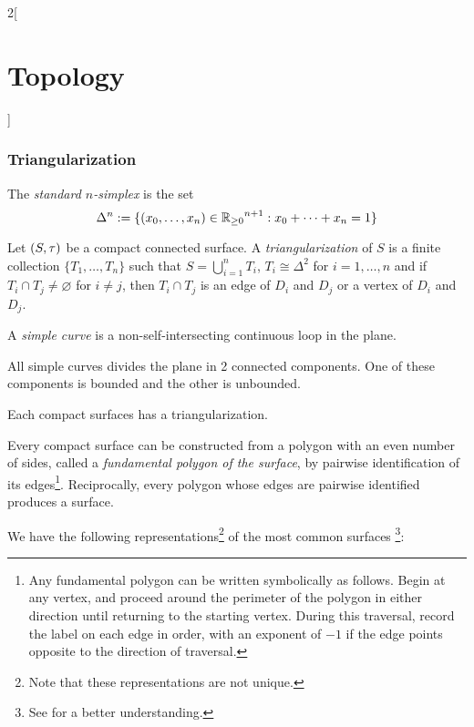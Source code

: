 \documentclass[../../../main_math.tex]{subfiles}
\begin{document}
\begin{multicols}{2}[\section{Topology}]
  \subsubsection{Triangularization}
  \begin{definition}
    The \emph{standard $n$-simplex} is the set $$\Delta^n:=\{(x_0,\ldots,x_n)\in{\ensuremath{\mathbb{R}}_{\geq 0}}^{n+1}:x_0+\cdots+x_n=1\}$$
  \end{definition}
  \begin{definition}
    Let $(S,\tau)$ be a compact connected surface. A \emph{triangularization} of $S$ is a finite collection $\{T_1,\ldots,T_n\}$ such that $S=\bigcup_{i=1}^nT_i$, $T_i\cong\Delta^2$ for $i=1,\ldots,n$ and if $T_i\cap T_j\ne\varnothing$ for $i\ne j$, then $T_i\cap T_j$ is an edge of $D_i$ and $D_j$ or a vertex of $D_i$ and $D_j$.
  \end{definition}
  \begin{definition}
    A \emph{simple curve} is a non-self-intersecting continuous loop in the plane.
  \end{definition}
  \begin{theorem}
    All simple curves divides the plane in 2 connected components. One of these components is bounded and the other is unbounded.
  \end{theorem}
  \begin{theorem}
    Each compact surfaces has a triangularization.
  \end{theorem}
  \begin{theorem}
    Every compact surface can be constructed from a polygon with an even number of sides, called a \emph{fundamental polygon of the surface}, by pairwise identification of its edges\footnote{Any fundamental polygon can be written symbolically as follows. Begin at any vertex, and proceed around the perimeter of the polygon in either direction until returning to the starting vertex. During this traversal, record the label on each edge in order, with an exponent of $-1$ if the edge points opposite to the direction of traversal.}. Reciprocally, every polygon whose edges are pairwise identified produces a surface.
  \end{theorem}
  \begin{proposition}
    We have the following representations\footnote{Note that these representations are not unique.} of the most common surfaces
    \footnote{See \protect{} for a better understanding.}:
    \begin{itemize}

\end{itemize}
\end{proposition}
\end{multicols}
\end{document}
